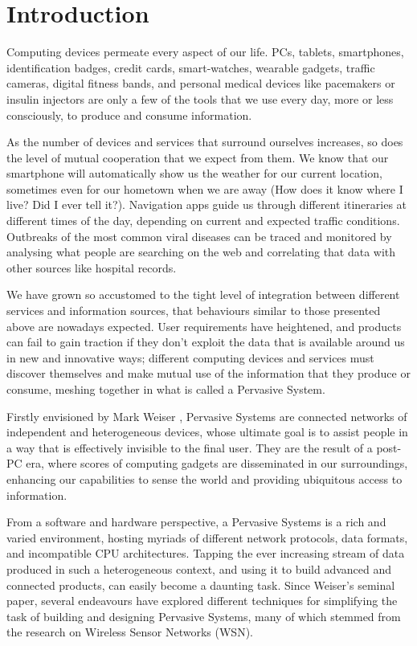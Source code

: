 \chapter{Introduction}

Computing devices permeate every aspect of our life. PCs, tablets, smartphones,
identification badges, credit cards, smart-watches, wearable gadgets, traffic
cameras, digital fitness bands, and personal medical devices like pacemakers or
insulin injectors are only a few of the tools that we use every day, more or
less consciously, to produce and consume information.

As the number of devices and services that surround ourselves increases, so
does the level of mutual cooperation that we expect from them. We know that our
smartphone will automatically show us the weather for our current location,
sometimes even for our hometown when we are away (How does it know where I
live? Did I ever tell it?). Navigation apps guide us through different
itineraries at different times of the day, depending on current and expected
traffic conditions. Outbreaks of the most common viral diseases can be traced
and monitored by analysing what people are searching on the web and correlating
that data with other sources like hospital records.

We have grown so accustomed to the tight level of integration between different
services and information sources, that behaviours similar to those presented
above are nowadays expected. User requirements have heightened, and products
can fail to gain traction if they don’t exploit the data that is available
around us in new and innovative ways; different computing devices and services
must discover themselves and make mutual use of the information that they
produce or consume, meshing together in what is called a Pervasive System.

Firstly envisioned by Mark Weiser \cite{weiser1991computer}, Pervasive Systems
are connected networks of independent and heterogeneous devices, whose ultimate
goal is to assist people in a way that is effectively invisible to the final
user. They are the result of a post-PC era, where scores of computing gadgets
are disseminated in our surroundings, enhancing our capabilities to sense the
world and providing ubiquitous access to information.

From a software and hardware perspective, a Pervasive Systems is a rich and
varied environment, hosting myriads of different network protocols, data
formats, and incompatible CPU architectures. Tapping the ever increasing stream
of data produced in such a heterogeneous context, and using it to build
advanced and connected products, can easily become a daunting task. Since
Weiser’s seminal paper, several endeavours have explored different techniques
for simplifying the task of building and designing Pervasive Systems, many of
    which stemmed from the research on Wireless Sensor Networks (WSN).


